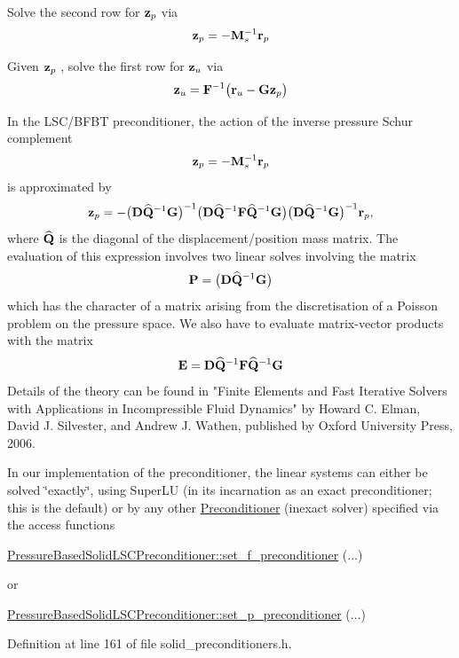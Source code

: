 \begin{DoxyEnumerate}
\item Solve the second row for $ {\bf z}_p$ via \[ {\bf z}_p = - {\bf M}_s^{-1} {\bf r}_p \]
\item Given $ {\bf z}_p $ , solve the first row for $ {\bf z}_u$ via \[ {\bf z}_u = {\bf F}^{-1} \big( {\bf r}_u - {\bf G} {\bf z}_p \big) \]
\end{DoxyEnumerate}In the L\+S\+C/\+B\+F\+BT preconditioner, the action of the inverse pressure Schur complement \[ {\bf z}_p = - {\bf M}_s^{-1} {\bf r}_p \] is approximated by \[ {\bf z}_p = - \big({\bf D} \widehat{\bf Q}^{-1}{\bf G} \big)^{-1} \big({\bf D} \widehat{\bf Q}^{-1}{\bf F} \widehat{\bf Q}^{-1}{\bf G}\big) \big({\bf D} \widehat{\bf Q}^{-1}{\bf G} \big)^{-1} {\bf r}_p, \] where $ \widehat{\bf Q} $ is the diagonal of the displacement/position mass matrix. The evaluation of this expression involves two linear solves involving the matrix \[ {\bf P} = \big({\bf D} \widehat{\bf Q}^{-1}{\bf G} \big) \] which has the character of a matrix arising from the discretisation of a Poisson problem on the pressure space. We also have to evaluate matrix-\/vector products with the matrix \[ {\bf E}={\bf D}\widehat{\bf Q}^{-1}{\bf F}\widehat{\bf Q}^{-1}{\bf G} \] Details of the theory can be found in "Finite Elements and Fast Iterative Solvers with Applications in Incompressible Fluid Dynamics" by Howard C. Elman, David J. Silvester, and Andrew J. Wathen, published by Oxford University Press, 2006.

In our implementation of the preconditioner, the linear systems can either be solved \char`\"{}exactly\char`\"{}, using Super\+LU (in its incarnation as an exact preconditioner; this is the default) or by any other \hyperlink{classoomph_1_1Preconditioner}{Preconditioner} (inexact solver) specified via the access functions 
\begin{DoxyCode}
\hyperlink{classoomph_1_1PressureBasedSolidLSCPreconditioner_ac62a1112a99ae9503b97bd1c26f086f2}{PressureBasedSolidLSCPreconditioner::set\_f\_preconditioner}
      (...)
\end{DoxyCode}
 or 
\begin{DoxyCode}
\hyperlink{classoomph_1_1PressureBasedSolidLSCPreconditioner_a921f36ec8af49017b799a3832d7f688f}{PressureBasedSolidLSCPreconditioner::set\_p\_preconditioner}
      (...)
\end{DoxyCode}
 

Definition at line 161 of file solid\+\_\+preconditioners.\+h.



